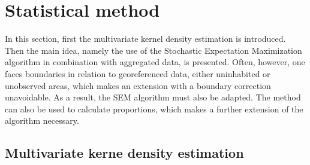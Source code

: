 \hypertarget{Statistical-method}{%
\section{Statistical method}\label{Statistical-method}}

In this section, first the multivariate kernel density estimation is introduced. Then the main idea, namely the use of the Stochastic Expectation Maximization algorithm in combination with aggregated data, is presented. Often, however, one faces boundaries in relation to georeferenced data, either uninhabited or unobserved areas, which makes an extension with a boundary correction unavoidable. As a result, the SEM algorithm must also be adapted. The method can also be used to calculate proportions, which makes a further extension of the algorithm necessary. 

\hypertarget{Multivariate-kernel-kensity-estimation}{%
\subsection{Multivariate kerne density estimation}\label{Multivariate-kernel-density-estimation}}

